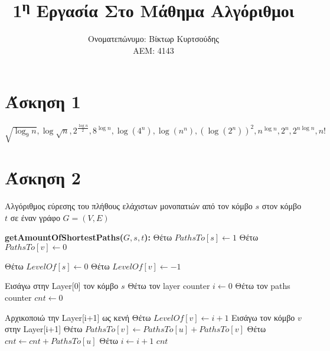 \documentclass[a4paper,10pt]{article}
\title{1\textsuperscript{η} Εργασία Στο Μάθημα Αλγόριθμοι}
\author{Ονοματεπώνυμο: Βίκτωρ Κυρτσούδης \\ ΑΕΜ: 4143}
\date{}
\begin{document}
\maketitle
\begin{flushleft}

    \section*{Άσκηση 1}
    $\sqrt{\log_9{n}}, \log{\sqrt{n}}, 2^{\frac{\log{n}}{2}}, 8^{\log{n}}, \log{(4^n)}, \log{(n^n)}, (\log{(2^n)})^2, n^{\log{n}}, 2^n, 2^{n\log{n}}, n!$

    \newpage
    \section*{Άσκηση 2}
    
    \begin{algorithm}
        \caption*{Αλγόριθμος εύρεσης του πλήθους ελάχιστων μονοπατιών από τον κόμβο $s$ στον κόμβο $t$ σε έναν γράφο $G=(V, E)$}

        \begin{algorithmic}[1]
        \STATE \textbf{getAmountOfShortestPaths($G, s, t$):}
        \newline
        \STATE Θέτω $PathsTo[s] \gets 1$
            \STATE Θέτω $PathsTo[v] \gets 0$
        \ENDFOR

        \STATE Θέτω $LevelOf[s] \gets 0$
        \STATE Θέτω $LevelOf[v] \gets -1$
        \ENDFOR
        
        \STATE Εισάγω στην Layer[0] τον κόμβο $s$
        \STATE Θέτω τον layer counter $i \gets 0$
        \STATE Θέτω τον paths counter $cnt \gets 0$

            \STATE Αρχικοποιώ την Layer[i+1] ως κενή
                        \STATE Θέτω $LevelOf[v] \gets i+1$
                        \STATE Εισάγω τον κόμβο $v$ στην Layer[i+1]
                    \ENDIF
                        \STATE Θέτω $PathsTo[v] \gets PathsTo[u]+PathsTo[v]$
                    \ENDIF  
                        \STATE Θέτω $cnt \gets cnt  + PathsTo[u]$
                    \ENDIF
                \ENDFOR
            \ENDFOR
            \STATE Θέτω $i \gets i + 1$
        \ENDWHILE
        \RETURN $cnt$
        \end{algorithmic}
    \end{algorithm}


\end{flushleft}
\end{document}
